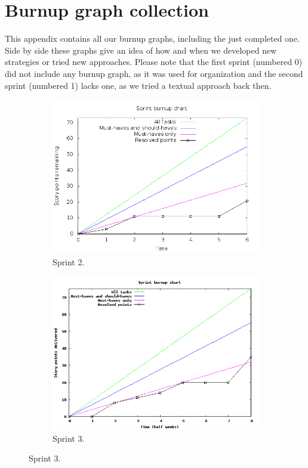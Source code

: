 \documentclass[a4paper,11pt]{article}
\begin{document}
\section{Burnup graph collection}
\label{sec:burnup_graphs}
This appendix contains all our burnup graphs, including the just
completed one. Side by side these graphs give an idea of how and when we
developed new strategies or tried new approaches. Please note that the first
sprint (numbered 0) did not include any burnup graph, as it was used for organization and the
second sprint (numbered 1) lacks one, as we tried a textual approach back then.
\begin{figure}[!ht]
	\centering
	\begin{subfigure}[b]{0.4\textwidth}
		\centering
		\includegraphics[width=\textwidth]{img/burnup_sprint_3.png}
		\caption{Sprint 2.}
	\end{subfigure}
	\begin{subfigure}[b]{0.4\textwidth}
		\centering
		\includegraphics[width=\textwidth]{img/burnup_sprint_4.png}
		\caption{Sprint 3.}
	\end{subfigure}


\end{figure}
\end{document}
